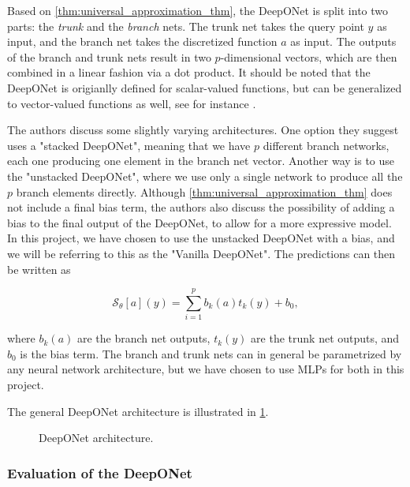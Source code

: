 Based on \cref{thm:universal_approximation_thm}, the DeepONet is split into two parts: the \textit{trunk} and the \textit{branch} nets. 
The trunk net takes the query point $y$ as input, and the branch net takes the discretized function $a$ as input.
The outputs of the branch and trunk nets result in two \(p\)-dimensional vectors, which are then combined in a 
linear fashion via a dot product. It should be noted that the DeepONet is origianlly defined for scalar-valued functions, but can
be generalized to vector-valued functions as well, see for instance .

The authors discuss some slightly varying architectures. 
One option they suggest uses a "stacked DeepONet", meaning that we have \(p\) different branch networks, each one producing one element in the 
branch net vector.
Another way is to use the "unstacked DeepONet", where we use only a single network to produce all the \(p\) branch elements directly.
Although \cref{thm:universal_approximation_thm} does not include a final bias term, the authors also discuss the possibility of 
adding a bias to the final output of the DeepONet, to allow for a more expressive model.
In this project, we have chosen to use the unstacked DeepONet with a bias, and we will be referring to this as the "Vanilla DeepONet".
The predictions can then be written as

\begin{equation}
    \mathcal{S}_\theta[a](y) = \sum_{i=1}^p b_k(a) t_k(y) + b_0,
    \label{eq:DeepONet_prediction}
\end{equation}

where $b_k(a)$ are the branch net outputs, $t_k(y)$ are the trunk net outputs, and $b_0$ is the bias term.
The branch and trunk nets can in general be parametrized by any neural network architecture, but we have chosen to use MLPs for both in this project.

The general DeepONet architecture is illustrated in \cref{fig:DeepONet}.

\begin{figure}[h!]
    \centering
    
    \caption[DeepONet architecture]{DeepONet architecture.}
    \label{fig:DeepONet}
\end{figure}

\subsubsection{Evaluation of the DeepONet}

